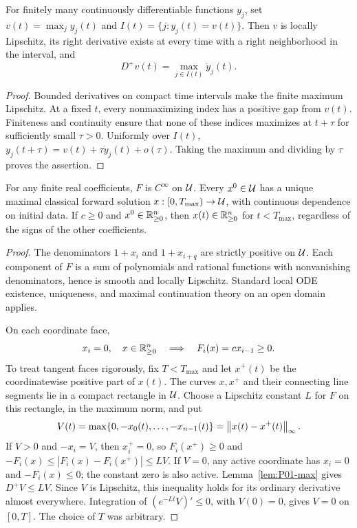 \begin{lemma}
\label{lem:P01-max}
For finitely many continuously differentiable functions $y_j$, set
$v(t)=\max_j y_j(t)$ and $I(t)=\{j:y_j(t)=v(t)\}$.
Then $v$ is locally Lipschitz, its right derivative exists at every
time with a right neighborhood in the interval, and
\begin{equation}
\label{eq:P01-max}
 D^+v(t)=\max_{j\in I(t)}\dot y_j(t).
\end{equation}
\end{lemma}
\begin{proof}
Bounded derivatives on compact time intervals make the finite maximum
Lipschitz. At a fixed $t$, every nonmaximizing index has a positive gap
from $v(t)$. Finiteness and continuity ensure that none of these indices
maximizes at $t+\tau$ for sufficiently small $\tau>0$. Uniformly over
$I(t)$,
$y_j(t+\tau)=v(t)+\tau\dot y_j(t)+o(\tau)$.
Taking the maximum and dividing by $\tau$ proves the assertion.
\end{proof}

\begin{proposition}
\label{prop:P01-local}
For any finite real coefficients, $F$ is $C^\infty$ on $\mathcal{U}$.
Every $x^0\in\mathcal{U}$ has a unique maximal classical forward solution
$x:[0,T_{\max})\to\mathcal{U}$, with continuous dependence on initial data.
If $c\ge0$ and $x^0\in\mathbb{R}_{\geq 0}^{n}$, then $x(t)\in\mathbb{R}_{\geq 0}^{n}$ for $t<T_{\max}$,
regardless of the signs of the other coefficients.
\end{proposition}
\begin{proof}
The denominators $1+x_i$ and $1+x_{i+q}$ are strictly positive on
$\mathcal{U}$. Each component of $F$ is a sum of polynomials and rational
functions with nonvanishing denominators, hence is smooth and locally
Lipschitz. Standard local ODE existence, uniqueness, and maximal
continuation theory on an open domain applies.

On each coordinate face,
\begin{equation}
\label{eq:P01-face}
 x_i=0,\quad x\in\mathbb{R}_{\geq 0}^{n}\quad\Longrightarrow\quad F_i(x)=c x_{i-1}\ge0.
\end{equation}
To treat tangent faces rigorously, fix $T<T_{\max}$ and let $x^+(t)$
be the coordinatewise positive part of $x(t)$. The curves $x,x^+$ and
their connecting line segments lie in a compact rectangle in $\mathcal{U}$.
Choose a Lipschitz constant $L$ for $F$ on this rectangle, in the
maximum norm, and put
\[
 V(t)=\max\{0,-x_0(t),\ldots,-x_{n-1}(t)\}
      =\left\lVert x(t)-x^+(t)\right\rVert_\infty.
\]
If $V>0$ and $-x_i=V$, then $x_i^+=0$, so
$F_i(x^+)\ge0$ and $-F_i(x)\le |F_i(x)-F_i(x^+)|\le LV$.
If $V=0$, any active coordinate has $x_i=0$ and $-F_i(x)\le0$;
the constant zero is also active. Lemma~\ref{lem:P01-max} gives
$D^+V\le LV$. Since $V$ is Lipschitz, this inequality holds for its
ordinary derivative almost everywhere. Integration of
$(e^{-Lt}V)' \le0$, with $V(0)=0$, gives $V=0$ on $[0,T]$.
The choice of $T$ was arbitrary.
\end{proof}

